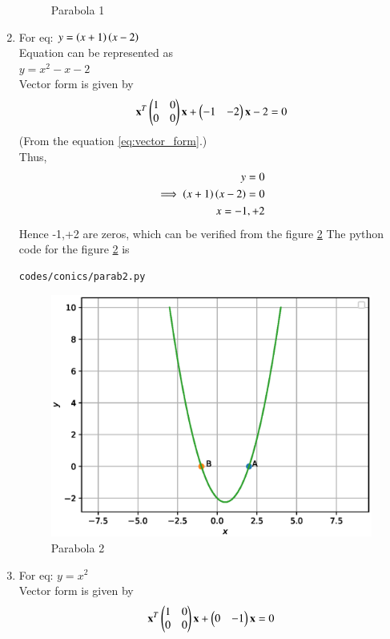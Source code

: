 \begin{enumerate}[label=\arabic*.,ref=\thesubsubsection.\theenumi]
\begin{figure}[!ht]
\caption{Parabola 1}
\label{fig:parab1}
\end{figure}
\item For eq: $ y = \left(x+1\right) \left(x-2\right)$
\\
Equation can be represented as
\\
$y=x^2-x-2$
\\
Vector form is given by
\begin{align}
\mathbf{x}^T \begin{pmatrix}1 & 0\\0 & 0\end{pmatrix}\mathbf{x}+\begin{pmatrix}-1 & -2\end{pmatrix}\mathbf{x}-2=0
\end{align}
(From the equation \ref{eq:vector_form}.)
\\
Thus,
\begin{align}
y=0
\\
\implies \left(x+1\right) \left(x-2\right)=0
\\
x=-1,+2
\end{align}
Hence -1,+2 are zeros, which can be verified from the figure \ref{fig:parab2}
The python code for the figure \ref{fig:parab2} is
\begin{lstlisting}
codes/conics/parab2.py
\end{lstlisting}
\begin{figure}[!ht]
\includegraphics[width=\columnwidth]{./figs/conics/parabola2.eps}
\caption{Parabola 2}
\label{fig:parab2}
\end{figure}
\item For eq: $ y = x^2$
\\
Vector form is given by
\begin{align}
\vec{x}^T \myvec{1 & 0\\0 & 0}\vec{x}+\myvec{0 & -1}\vec{x}=0

\end{align}
\end{enumerate}
